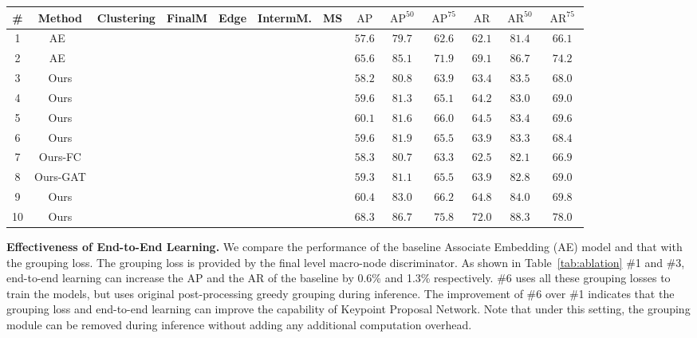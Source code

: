 \documentclass[runningheads]{llncs}
\begin{document}
	\begin{table*}[t]
		\centering
		\scriptsize
		\caption{Ablation study of HGG's components on the COCO validation dataset.``FinalM'' means the final level macro-node discriminator. ``Edge'' means edge discriminator. `` IntermM'' means intermediate macro-node discriminator. ``MS'' means multi-scale testing. }
		\begin{tabular}{c|c|c|c|c|c|c|c|c|c|c|c|c}
			\hline
			\# & Method & Clustering  & FinalM & Edge & IntermM. & MS & $\operatorname{AP}$ & $\operatorname{AP}^{50}$ & $\operatorname{AP}^{75}$  & $\operatorname{AR}$ & $\operatorname{AR}^{50}$ & $\operatorname{AR}^{75}$ \\
			\hline
			1 & AE~\cite{newell2017associative} &  & & & & &$57.6$ &$79.7$ & $62.6$ & $62.1$ & $81.4$ & $66.1$ \\
			2 & AE~\cite{newell2017associative} &  & & & & \checkmark &$65.6$ &$85.1$ & $71.9$ & $69.1$ & $86.7$ & $74.2$ \\ \hline
			3 & Ours &\checkmark  & \checkmark& &  &  & $58.2$ & $80.8$ & $63.9$ & $63.4$ & $83.5$ & $68.0$ \\
			4 & Ours &\checkmark  &  & \checkmark &  &  & $59.6$ & $81.3$ & $65.1$ & $64.2$ & $83.0$ & $69.0$ \\
			5 & Ours &\checkmark  & \checkmark& \checkmark & & & $60.1$ & $81.6$ & $66.0$ & $64.5$ & $83.4$ & $69.6$ \\
			6 & Ours &  & \checkmark&\checkmark &\checkmark & & $59.6$ & $81.9$ & $65.5$  & $63.9$ & $83.3$ & $68.4$ \\
			7 & Ours-FC &\checkmark  & \checkmark&\checkmark &\checkmark & & $58.3$ & $80.7$ & $63.3$  & $62.5$ & $82.1$ & $66.9$ \\
			8 & Ours-GAT &\checkmark  & \checkmark&\checkmark &\checkmark & & $59.3$ & $81.1$ & $65.5$  & $63.9$ & $82.8$ & $69.0$ \\
			9 & Ours &\checkmark  & \checkmark&\checkmark &\checkmark & & $60.4$ & $83.0$ & $66.2$  & $64.8$ & $84.0$ & $69.8$ \\
			10& Ours &\checkmark  & \checkmark&\checkmark &\checkmark &\checkmark & $68.3$ & $86.7$ & $75.8$ & $72.0$ & $88.3$ & $78.0$ \\ \hline
		\end{tabular}
		\label{tab:ablation}
	\end{table*}
	
	\textbf{Effectiveness of End-to-End Learning.}
	We compare the performance of the baseline Associate Embedding (AE) model and that with the grouping loss. The grouping loss is provided by the final level macro-node discriminator. As shown in Table~\ref{tab:ablation} \#1 and \#3, end-to-end learning can increase the AP and the AR of the baseline by 0.6\% and 1.3\% respectively. \#6 uses all these grouping losses to train the models, but uses original post-processing greedy grouping during inference. The improvement of \#6 over \#1 indicates that the grouping loss and end-to-end learning can improve the capability of Keypoint Proposal Network. Note that under this setting, the grouping module can be removed during inference without adding any additional computation overhead.
	
\end{document}

